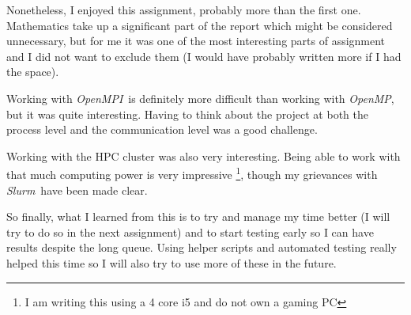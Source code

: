 \documentclass[10pt, a4paper]{article}
\newcommand{\omp}{\textit{OpenMP}}
\newcommand{\mpi}{\textit{OpenMPI}}
\newcommand{\slurm}{\textit{Slurm}}
\begin{document}
Nonetheless, I enjoyed this assignment, probably more than the first one. Mathematics take up
a significant part of the report which might be considered unnecessary, but for me it was
one of the most interesting parts of assignment and I did not want to exclude them (I would have probably
written more if I had the space).

Working with \mpi \ is definitely more difficult than working with \omp, but it was quite interesting.
Having to think about the project at both the process level and the communication level was a good challenge.

Working with the HPC cluster was also very interesting.
Being able to work with that much computing power is very impressive
\footnote{I am writing this using a 4 core i5 and do not own a gaming PC}, 
though my grievances with \slurm \ have been made clear.

So finally, what I learned from this is to try and manage my time better (I will try to do
so in the next assignment) and to start testing early so I can have results despite the long queue.
Using helper scripts and automated testing really helped this time so I will also try to use more of these
in the future.
\end{document}
